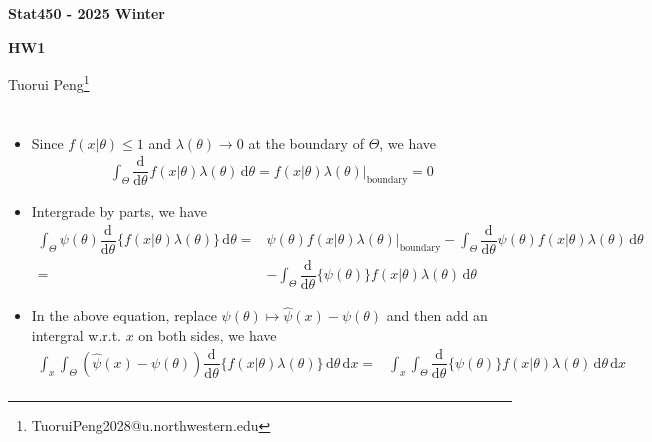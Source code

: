 \documentclass[11pt,a4paper]{ctexart}
\numberwithin{equation}{section}%
\begin{document}
\begin{center}\thispagestyle{plain}

{\LARGE\textbf{Stat450 - 2025 Winter}}

{\Large\textbf{HW1}}

Tuorui Peng\footnote{TuoruiPeng2028@u.northwestern.edu}
\end{center}

\thispagestyle{myheadings}
\pagestyle{myheadings}






\section{}


\begin{itemize}[topsep=2pt,itemsep=0pt]
    \item Since $ f(x|\theta )\leq 1 $ and $ \lambda (\theta )\to 0 $ at the boundary of $ \Theta  $, we have
    \begin{align*}
        \int_\Theta \dfrac{\mathrm{d}^{}  }{\mathrm{d} \theta ^{} }f(x|\theta )\lambda (\theta ) \,\mathrm{d}\theta = f(x|\theta )\lambda (\theta ) \Big|_{\text{boundary}} = 0
    \end{align*}
    \item Intergrade by parts, we have
    \begin{align*}
        \int_\Theta  \psi(\theta )\dfrac{\mathrm{d}^{}  }{\mathrm{d} \theta ^{} }\{f(x|\theta )\lambda (\theta )\} \,\mathrm{d}\theta = & \psi(\theta )f(x|\theta )\lambda (\theta ) \Big|_{\text{boundary}} - \int_\Theta  \dfrac{\mathrm{d}^{}  }{\mathrm{d} \theta ^{} }\psi(\theta )f(x|\theta )\lambda (\theta ) \,\mathrm{d}\theta \\
        =& - \int_\Theta  \dfrac{\mathrm{d}^{}  }{\mathrm{d} \theta ^{} }\{\psi(\theta )\}f(x|\theta )\lambda (\theta ) \,\mathrm{d}\theta
    \end{align*}
    \item In the above equation, replace $ \psi(\theta ) \mapsto \hat{\psi}(x) - \psi(\theta ) $ and then add an intergral w.r.t. $ x $ on both sides, we have
    \begin{align*}
        \int_x  \int_\Theta  (\hat{\psi}(x)-\psi(\theta ))\dfrac{\mathrm{d}^{}  }{\mathrm{d} \theta ^{} }\{f(x|\theta )\lambda (\theta )\} \,\mathrm{d}\theta \,\mathrm{d}x = & \int_x\int_\Theta  \dfrac{\mathrm{d}^{}  }{\mathrm{d} \theta ^{} }\{\psi(\theta )\}f(x|\theta )\lambda (\theta ) \,\mathrm{d}\theta\,\mathrm{d}x\\

\end{align*}
\end{itemize}
\end{document}
